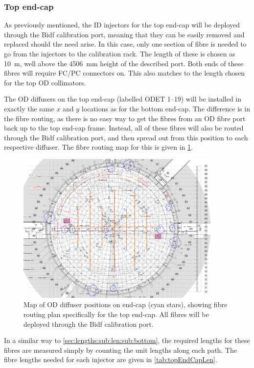 \documentclass[a4paper,11pt]{article}
\begin{document}
\subsubsection{Top end-cap}\label{sec:lengths:sub:len:sub:top}

As previously mentioned, the ID injectors for the top end-cap will be deployed through the Bidf calibration port, meaning that they can be easily removed and replaced should the need arise. In this case, only one section of fibre is needed to go from the injectors to the calibration rack. The length of these is chosen as 10~m, well above the 4506~mm height of the described port. Both ends of these fibres will require FC/PC connectors on. This also matches to the length chosen for the top OD collimators.

The OD diffusers on the top end-cap (labelled ODET 1--19) will be installed in exactly the same $x$ and $y$ locations as for the bottom end-cap. The difference is in the fibre routing, as there is no easy way to get the fibres from an OD fibre port back up to the top end-cap frame. Instead, all of these fibres will also be routed through the Bidf calibration port, and then spread out from this position to each respective diffuser. The fibre routing map for this is given in \cref{fig:topEndCap}.
\begin{figure}[h]
\centering
\includegraphics[width=0.9\textwidth]{topEndCapMap}
\caption{Map of OD diffuser positions on end-cap (cyan stars), showing fibre routing plan specifically for the top end-cap. All fibres will be deployed through the Bidf calibration port.}\label{fig:topEndCap}
\end{figure}
In a similar way to \cref{sec:lengths:sub:len:sub:bottom}, the required lengths for these fibres are measured simply by counting the unit lengths along each path. The fibre lengths needed for each injector are given in \cref{tab:topEndCapLen}.
\end{document}
